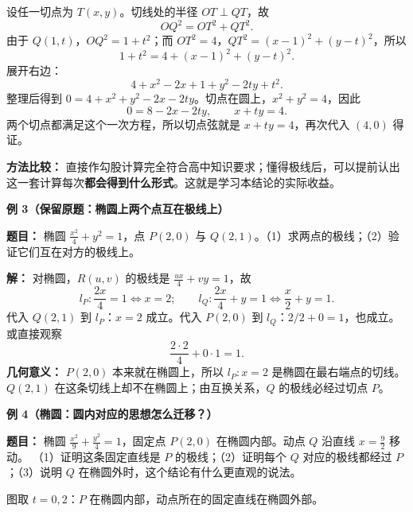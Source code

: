 \begin{examplebox}
设任一切点为 $T(x,y)$。切线处的半径 $OT\perp QT$，故
\[
OQ^2=OT^2+QT^2.
\]
由于 $Q(1,t)$，$OQ^2=1+t^2$；而 $OT^2=4$，$QT^2=(x-1)^2+(y-t)^2$，所以
\[
1+t^2=4+(x-1)^2+(y-t)^2.
\]
展开右边：
\[
4+x^2-2x+1+y^2-2ty+t^2.
\]
整理后得到 $0=4+x^2+y^2-2x-2ty$。切点在圆上，$x^2+y^2=4$，因此
\[0=8-2x-2ty,\qquad\boxed{x+ty=4}.\]
两个切点都满足这个一次方程，所以切点弦就是 $x+ty=4$，再次代入 $(4,0)$ 得证。

\textbf{方法比较：} 直接作勾股计算完全符合高中知识要求；懂得极线后，可以提前认出这一套计算每次\textbf{都会得到什么形式}。这就是学习本结论的实际收益。

\medskip
\textbf{\textcolor{CExample}{例 3（保留原题：椭圆上两个点互在极线上）}}

\textbf{题目：} 椭圆 $\frac{x^2}{4}+y^2=1$，点 $P(2,0)$ 与 $Q(2,1)$。（1）求两点的极线；（2）验证它们互在对方的极线上。

\textbf{解：} 对椭圆，$R(u,v)$ 的极线是 $\frac{ux}{4}+vy=1$，故
\[
l_P:\frac{2x}{4}=1\iff x=2;
\qquad l_Q:\frac{2x}{4}+y=1\iff\frac{x}{2}+y=1.
\]
代入 $Q(2,1)$ 到 $l_P$：$x=2$ 成立。代入 $P(2,0)$ 到 $l_Q$：$2/2+0=1$，也成立。或直接观察
\[
\frac{2\cdot2}{4}+0\cdot1=1.
\]
\textbf{几何意义：} $P(2,0)$ 本来就在椭圆上，所以 $l_P:x=2$ 是椭圆在最右端点的切线。$Q(2,1)$ 在这条切线上却不在椭圆上；由互换关系，$Q$ 的极线必经过切点 $P$。

\medskip
\textbf{\textcolor{CExample}{例 4（椭圆：圆内对应的思想怎么迁移？）}}

\textbf{题目：} 椭圆 $\frac{x^2}{9}+\frac{y^2}{4}=1$，固定点 $P(2,0)$ 在椭圆内部。动点 $Q$ 沿直线 $x=\frac92$ 移动。
（1）证明这条固定直线是 $P$ 的极线；（2）证明每个 $Q$ 对应的极线都经过 $P$；（3）说明 $Q$ 在椭圆外时，这个结论有什么更直观的说法。


\begin{center}

\end{center}
图取 $t=0,2$：$P$ 在椭圆内部，动点所在的固定直线在椭圆外部。


\end{examplebox}
